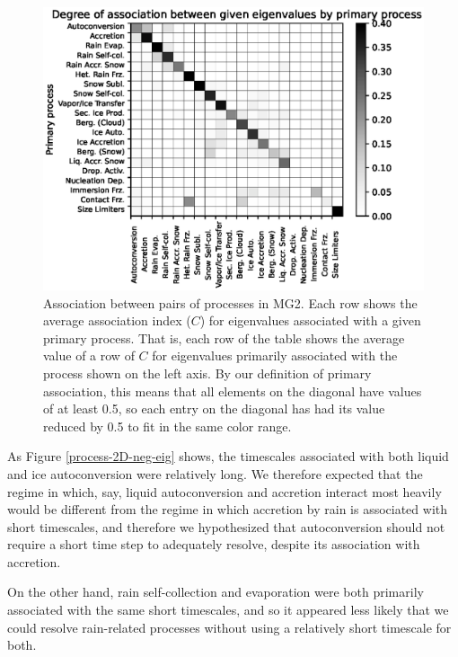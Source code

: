 \documentclass [11pt, proquest] {uwthesis}[2020/02/24]
\begin{document}
\begin{figure}[htbp]
  \includegraphics[width=6.5in]{./process_association.eps}
  \caption[Association between pairs of processes in MG2 based on Jacobian eigenvalues]{Association between pairs of processes in MG2. Each row shows the average association index ($C$) for eigenvalues associated with a given primary process. That is, each row of the table shows the average value of a row of $C$ for eigenvalues primarily associated with the process shown on the left axis. By our definition of primary association, this means that all elements on the diagonal have values of at least \num{0.5}, so each entry on the diagonal has had its value reduced by \num{0.5} to fit in the same color range.}
  \label{process-association}
\end{figure}

As Figure \ref{process-2D-neg-eig} shows, the timescales associated with both liquid and ice autoconversion were relatively long. We therefore expected that the regime in which, say, liquid autoconversion and accretion interact most heavily would be different from the regime in which accretion by rain is associated with short timescales, and therefore we hypothesized that autoconversion should not require a short time step to adequately resolve, despite its association with accretion.

On the other hand, rain self-collection and evaporation were both primarily associated with the same short timescales, and so it appeared less likely that we could resolve rain-related processes without using a relatively short timescale for both.
\end{document}
